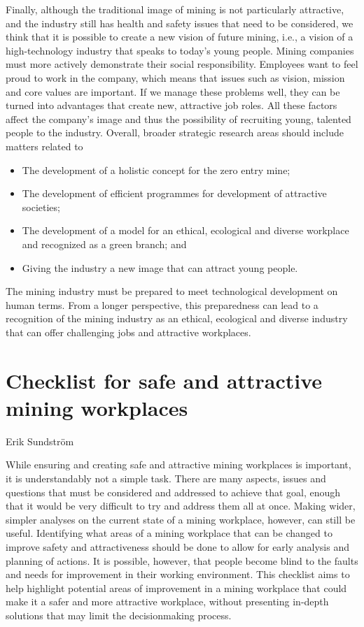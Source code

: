 \documentclass[
  12pt,
]{scrbook}
\newenvironment{chap-auth}
{\vspace{1cm}\begin{center}\begin{flushright}\sffamily\noindent}
  {\end{flushright}\end{center}\vspace{1cm}}
\begin{document}
Finally, although the traditional image of mining is not particularly attractive, and the industry still has health and safety issues that need to be considered, we think that it is possible to create a new vision of future mining, i.e., a vision of a high-technology industry that speaks to today's young people. Mining companies must more actively demonstrate their social responsibility. Employees want to feel proud to work in the company, which means that issues such as vision, mission and core values are important. If we manage these problems well, they can be turned into advantages that create new, attractive job roles. All these factors affect the company's image and thus the possibility of recruiting young, talented people to the industry. Overall, broader strategic research areas should include matters related to

\begin{itemize}
\item
  The development of a holistic concept for the zero entry mine;
\item
  The development of efficient programmes for development of attractive societies;
\item
  The development of a model for an ethical, ecological and diverse workplace and recognized as a green branch; and
\item
  Giving the industry a new image that can attract young people.
\end{itemize}

The mining industry must be prepared to meet technological development on human terms. From a longer perspective, this preparedness can lead to a recognition of the mining industry as an ethical, ecological and diverse industry that can offer challenging jobs and attractive workplaces.

\hypertarget{checklist-for-safe-and-attractive-mining-workplaces}{%
\chapter{Checklist for safe and attractive mining workplaces}\label{checklist-for-safe-and-attractive-mining-workplaces}}

\begin{chap-auth}
Erik Sundström
\end{chap-auth}

While ensuring and creating safe and attractive mining workplaces is important, it is understandably not a simple task.
There are many aspects, issues and questions that must be considered and addressed to achieve that goal, enough that it would be very difficult to try and address them all at once. Making wider, simpler analyses on the current state of a mining workplace, however, can still be useful. Identifying what areas of a mining workplace that can be changed to improve safety and attractiveness should be done to allow for early analysis and planning of actions. It is possible, however, that people become blind to the faults and needs for improvement in their working environment. This checklist aims to help highlight potential areas of improvement in a mining workplace that could make it a safer and more attractive workplace, without presenting in-depth solutions that may limit the decisionmaking process.
\end{document}
